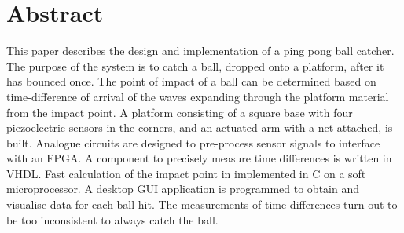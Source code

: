 \chapter*{Abstract}
This paper describes the design and implementation of a ping pong ball catcher.
The purpose of the system is to catch a ball, dropped onto a platform, after it has bounced once.
The point of impact of a ball can be determined based on time-difference of arrival of the waves expanding through the platform material from the impact point.
A platform consisting of a square base with four piezoelectric sensors in the corners, and an actuated arm with a net attached, is built.
Analogue circuits are designed to pre-process sensor signals to interface with an FPGA. A component to precisely measure time differences is written in VHDL.
Fast calculation of the impact point in implemented in C on a soft microprocessor.
A desktop GUI application is programmed to obtain and visualise data for each ball hit.
The measurements of time differences turn out to be too inconsistent to always catch the ball.
